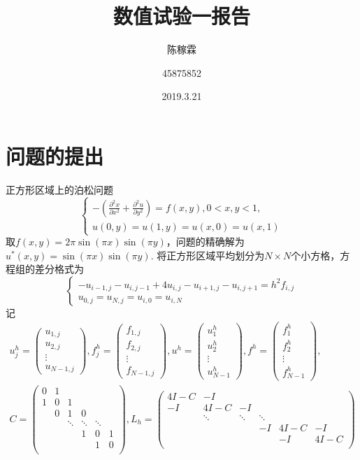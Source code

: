 \documentclass[10pt,a4paper]{article}
\title{数值试验一报告}
\author{陈稼霖 \and 45875852}
\date{2019.3.21}
\begin{document}
\maketitle
\section{问题的提出}
正方形区域上的泊松问题
\[
\left\{\begin{array}{l}
-(\frac{\partial^2x}{\partial x^2}+\frac{\partial^2u}{\partial y^2})=f(x,y),0<x,y<1,\\
u(0,y)=u(1,y)=u(x,0)=u(x,1)
\end{array}\right.
\]
取$f(x,y)=2\pi\sin(\pi x)\sin(\pi y)$，问题的精确解为$u^*(x,y)=\sin(\pi x)\sin(\pi y)$. 将正方形区域平均划分为$N\times N$个小方格，方程组的差分格式为
\[
\left\{\begin{array}{l}
-u_{i-1,j}-u_{i,j-1}+4u_{i,j}-u_{i+1,j}-u_{i,j+1}=h^2f_{i,j}\\
u_{0,j}=u_{N,j}=u_{i,0}=u_{i,N}
\end{array}\right.
\]
记
\begin{gather*}
u_j^h=\left(\begin{array}{l}
u_{1,j}\\
u_{2,j}\\
\vdots\\
u_{N-1,j}
\end{array}\right),
f_j^h=\left(\begin{array}{l}
f_{1,j}\\
f_{2,j}\\
\vdots\\
f_{N-1,j}
\end{array}\right),
u^h=\left(\begin{array}{l}
u_1^h\\
u_2^h\\
\vdots\\
u_{N-1}^h
\end{array}\right),
f^h=\left(\begin{array}{l}
f_1^h\\
f_2^h\\
\vdots\\
f_{N-1}^h
\end{array}\right),\\
C=\left(\begin{array}{cccccc}
0 & 1 &    &    &    &\\
1 & 0 & 1 &    &    &\\
   & 0 & 1 & 0 &    &\\
   &    & \ddots & \ddots & \ddots &\\
   &    &    & 1 & 0 & 1\\
   &    &    &    & 1 & 0\\
\end{array}\right),
L_h=\left(\begin{array}{cccccc}
4I-C & -I &    &    &    &\\
-I & 4I-C & -I &    &    &\\
   & \ddots & \ddots & \ddots & &\\
   &    &    & -I & 4I-C & -I\\
   &    &    &    & -I & 4I-C\\
\end{array}\right)
\end{gather*}
\end{document}
